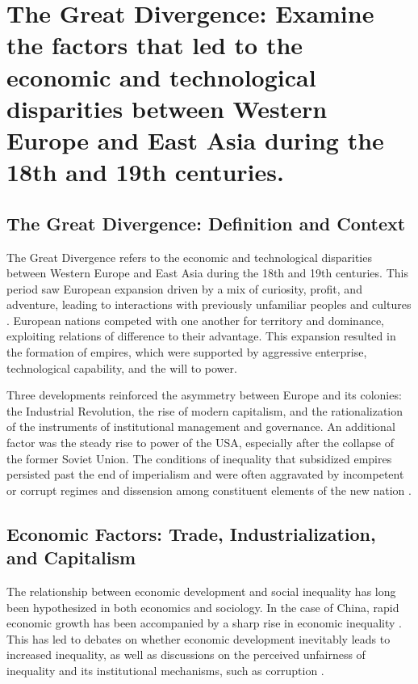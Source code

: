 \documentclass{article}
\begin{document}
\section{The Great Divergence: Examine the factors that led to the economic and technological disparities between Western Europe and East Asia during the 18th and 19th centuries.}

\subsection{The Great Divergence: Definition and Context}

The Great Divergence refers to the economic and technological disparities between Western Europe and East Asia during the 18th and 19th centuries. This period saw European expansion driven by a mix of curiosity, profit, and adventure, leading to interactions with previously unfamiliar peoples and cultures \cite{Patke2006PostcolonialC}. European nations competed with one another for territory and dominance, exploiting relations of difference to their advantage. This expansion resulted in the formation of empires, which were supported by aggressive enterprise, technological capability, and the will to power. 

Three developments reinforced the asymmetry between Europe and its colonies: the Industrial Revolution, the rise of modern capitalism, and the rationalization of the instruments of institutional management and governance. An additional factor was the steady rise to power of the USA, especially after the collapse of the former Soviet Union. The conditions of inequality that subsidized empires persisted past the end of imperialism and were often aggravated by incompetent or corrupt regimes and dissension among constituent elements of the new nation \cite{Patke2006PostcolonialC}.

\subsection{Economic Factors: Trade, Industrialization, and Capitalism}

The relationship between economic development and social inequality has long been hypothesized in both economics and sociology. In the case of China, rapid economic growth has been accompanied by a sharp rise in economic inequality \cite{Xie2008ChineseP}. This has led to debates on whether economic development inevitably leads to increased inequality, as well as discussions on the perceived unfairness of inequality and its institutional mechanisms, such as corruption \cite{Xie2008ChineseP}.
\end{document}
